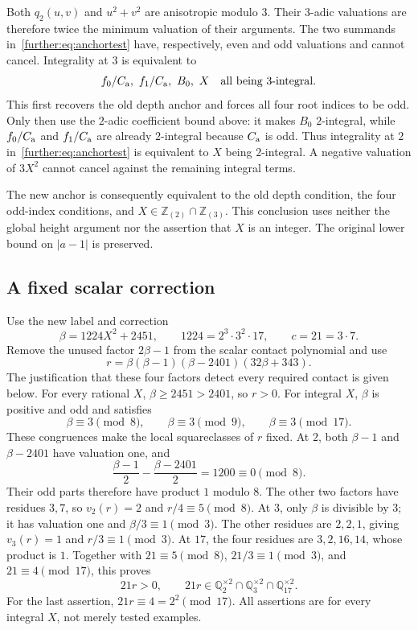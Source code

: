Both $q_2(u,v)$ and $u^2+v^2$ are anisotropic modulo $3$. Their
$3$-adic valuations are therefore twice the minimum valuation of their
arguments. The two summands in~\eqref{further:eq:anchortest} have,
respectively, even and odd valuations and cannot cancel.
Integrality at $3$ is equivalent to
\[
 f_0/C_{\rm a},\ f_1/C_{\rm a},\ B_0,\ X
 \quad\text{all being }3\text{-integral}.
\]
This first recovers the old depth anchor and forces all four root
indices to be odd. Only then use the $2$-adic coefficient bound above:
it makes $B_0$ $2$-integral, while $f_0/C_{\rm a}$ and
$f_1/C_{\rm a}$ are already $2$-integral because $C_{\rm a}$ is odd.
Thus integrality at $2$ in~\eqref{further:eq:anchortest} is equivalent
to $X$ being $2$-integral. A negative valuation of $3X^2$ cannot cancel
against the remaining integral terms.

The new anchor is consequently equivalent to the old depth condition,
the four odd-index conditions, and
$X\in\mathbb Z_{(2)}\cap\mathbb Z_{(3)}$.
This conclusion uses neither the global height argument nor the assertion
that $X$ is an integer. The original lower bound on $|a-1|$ is preserved.

\subsection{A fixed scalar correction}

Use the new label and correction
\begin{equation}\label{further:eq:newbeta}
 \beta=1224X^2+2451,
 \qquad 1224=2^3\cdot3^2\cdot17,
 \qquad c=21=3\cdot7.
\end{equation}
Remove the unused factor $2\beta-1$ from the scalar contact polynomial
and use
\begin{equation}\label{further:eq:r4}
 r=\beta(\beta-1)(\beta-2401)(32\beta+343).
\end{equation}
The justification that these four factors detect every required contact
is given below.
For every rational $X$, $\beta\ge2451>2401$, so $r>0$.
For integral $X$, $\beta$ is positive and odd and satisfies
\[
 \beta\equiv3\pmod8,\qquad
 \beta\equiv3\pmod9,\qquad
 \beta\equiv3\pmod{17}.
\]
These congruences make the local squareclasses of $r$ fixed.
At $2$, both $\beta-1$ and $\beta-2401$ have valuation one, and
\[
 \frac{\beta-1}{2}-\frac{\beta-2401}{2}=1200\equiv0\pmod8.
\]
Their odd parts therefore have product $1$ modulo $8$. The other two
factors have residues $3,7$, so $v_2(r)=2$ and $r/4\equiv5\pmod8$.
At $3$, only $\beta$ is divisible by $3$; it has valuation one and
$\beta/3\equiv1\pmod3$. The other residues are $2,2,1$, giving
$v_3(r)=1$ and $r/3\equiv1\pmod3$.
At $17$, the four residues are $3,2,16,14$, whose product is $1$.
Together with $21\equiv5\pmod8$, $21/3\equiv1\pmod3$, and
$21\equiv4\pmod{17}$, this proves
\[
 21r>0,\qquad
 21r\in\mathbb Q_2^{\times2}
      \cap\mathbb Q_3^{\times2}
      \cap\mathbb Q_{17}^{\times2}.
\]
For the last assertion, $21r\equiv4=2^2\pmod{17}$.
All assertions are for every integral $X$, not merely tested examples.

